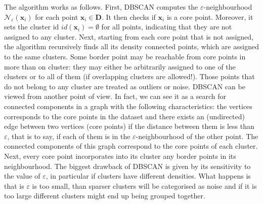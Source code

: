 \documentclass[a4paper]{article}
\begin{document}
	The algorithm works as follows. First, DBSCAN computes the $\varepsilon$-neighbourhood $\mathcal{N}_{\varepsilon} \left( \boldsymbol{x}_{i} \right)$ for each point $\boldsymbol{x}_{i} \in \boldsymbol{D}$. It then checks if $\boldsymbol{x}_{i}$ is a core point. Moreover, it sets the cluster id $id\left(\boldsymbol{x}_{i}\right) = \emptyset$ for all points, indicating that they are not assigned to any cluster.
	Next, starting from each core point that is not assigned, the algorithm recursively finds all its density connected points, which are assigned to the same clusters. Some border point may be reachable from core points in more than on cluster: they may either be arbitrarily assigned to one of the clusters or to all of them (if overlapping clusters are allowed!).
	Those points that do not belong to any cluster are treated as outliers or noise.
	DBSCAN can be viewed from another point of view. In fact, we can see it as a search for connected components in a graph with the following characteristics: the vertices corresponds to the core points in the dataset and there exists an (undirected) edge between two vertices (core points) if the distance between them is less than $\varepsilon$, that is to say, if each of them is in the $\varepsilon$-neighbourhood of the other point.
	The connected components of this graph correspond to the core points of each cluster. Next, every core point incorporates into its cluster any border points in its neighbourhood.
	The biggest drawback of DBSCAN is given by its sensitivity to the value of $\varepsilon$, in particular if clusters have different densities. What happens is that is $\varepsilon$ is too small, than sparser clusters will be categorised as noise and if it is too large different clusters might end up being grouped together.
	
		
\end{document}
